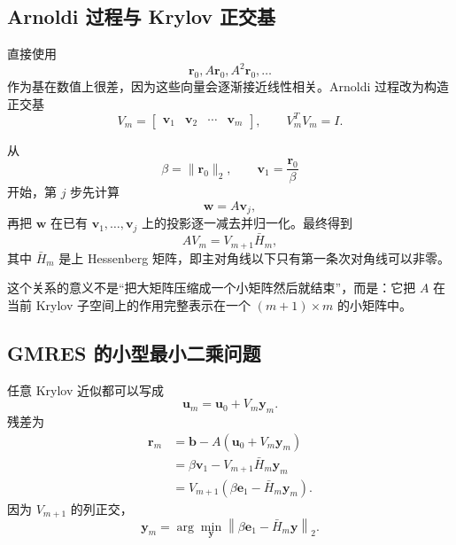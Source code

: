 \subsection{Arnoldi 过程与 Krylov 正交基}

直接使用
\begin{equation}
\bm r_0,
A\bm r_0,
A^2\bm r_0,
\ldots
\end{equation}
作为基在数值上很差，因为这些向量会逐渐接近线性相关。Arnoldi 过程改为构造正交基
\begin{equation}
V_m
=
\begin{bmatrix}
\bm v_1&\bm v_2&\cdots&\bm v_m
\end{bmatrix},
\qquad
V_m^TV_m=I.
\end{equation}

从
\begin{equation}
\beta=\|\bm r_0\|_2,
\qquad
\bm v_1=\frac{\bm r_0}{\beta}
\end{equation}
开始，第 $j$ 步先计算
\begin{equation}
\bm w=A\bm v_j,
\end{equation}
再把 $\bm w$ 在已有 $\bm v_1,\ldots,\bm v_j$ 上的投影逐一减去并归一化。最终得到
\begin{equation}
\boxed{
AV_m
=
V_{m+1}\bar H_m,
}
\label{eq:arnoldi-relation}
\end{equation}
其中 $\bar H_m$ 是上 Hessenberg 矩阵，即主对角线以下只有第一条次对角线可以非零。

这个关系的意义不是“把大矩阵压缩成一个小矩阵然后就结束”，而是：它把 $A$ 在当前 Krylov 子空间上的作用完整表示在一个 $(m+1)\times m$ 的小矩阵中。

\subsection{GMRES 的小型最小二乘问题}

任意 Krylov 近似都可以写成
\begin{equation}
\bm u_m
=
\bm u_0+V_m\bm y_m.
\end{equation}
残差为
\begin{align}
\bm r_m
&=
\bm b-A(\bm u_0+V_m\bm y_m)
\\
&=
\beta\bm v_1-V_{m+1}\bar H_m\bm y_m
\\
&=
V_{m+1}
\left(
\beta\bm e_1-\bar H_m\bm y_m
\right).
\end{align}
因为 $V_{m+1}$ 的列正交，
\begin{equation}
\boxed{
\bm y_m
=
\arg\min_{\bm y}
\left\|
\beta\bm e_1-\bar H_m\bm y
\right\|_2.
}
\label{eq:gmres-least-squares}
\end{equation}

